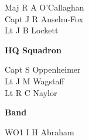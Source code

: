 \begin{multicols}{2}
  \small
  \noindent
  Maj R A O'Callaghan \\
  Capt J R Anselm-Fox \\
  Lt J B Lockett \\
\end{multicols}

\begin{center}
  \Large
  \textbf{HQ Squadron}
\end{center}

\begin{multicols}{2}
  \small
  \noindent
  Capt S Oppenheimer \\
  Lt J M Wagstaff \\
  Lt R C Naylor \\
\end{multicols}

\begin{center}
  \Large
  \textbf{Band}
\end{center}

\begin{multicols}{2}
  \small
  \noindent
  WO1 I H Abraham \\
\end{multicols}

